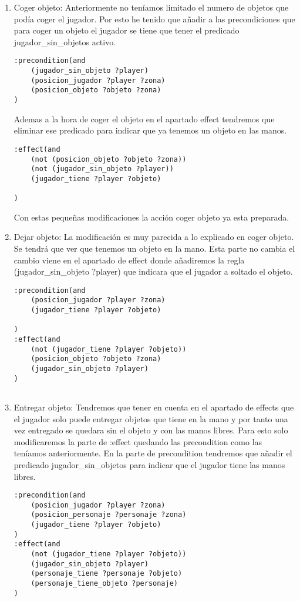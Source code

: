 \documentclass[]{article}
\begin{document}
\begin{enumerate}
	\item{Coger objeto:} Anteriormente no teníamos limitado el numero de objetos que podía coger el jugador. Por esto he tenido que añadir a las precondiciones que para coger un objeto el jugador se tiene que tener el predicado jugador\_sin\_objetos activo. 
	
	\begin{lstlisting}
:precondition(and			
	(jugador_sin_objeto ?player)
	(posicion_jugador ?player ?zona)
	(posicion_objeto ?objeto ?zona)
)
	\end{lstlisting}
	
	Ademas a la hora de coger el objeto en el apartado effect tendremos que eliminar ese predicado para indicar que ya tenemos un objeto en las manos.
	
	\begin{lstlisting}
:effect(and 
	(not (posicion_objeto ?objeto ?zona))
	(not (jugador_sin_objeto ?player))
	(jugador_tiene ?player ?objeto)
	
)
	\end{lstlisting}
	Con estas pequeñas modificaciones la acción coger objeto ya esta preparada.
	
	\item{Dejar objeto:} La modificación es muy parecida a lo explicado en coger objeto. Se tendrá que ver que tenemos un objeto en la mano. Esta parte no cambia el cambio viene en el apartado de effect donde añadiremos la regla (jugador\_sin\_objeto ?player) que indicara que el jugador a soltado el objeto.
	
	
	
	\begin{lstlisting}
:precondition(and
	(posicion_jugador ?player ?zona)
	(jugador_tiene ?player ?objeto)
	
)
:effect(and 
	(not (jugador_tiene ?player ?objeto))
	(posicion_objeto ?objeto ?zona)
	(jugador_sin_objeto ?player)
)
	

	\end{lstlisting}
\item{Entregar objeto:} Tendremos que tener en cuenta en el apartado de effects que el jugador solo puede entregar objetos que tiene en la mano y por tanto una vez entregado se quedara sin el objeto y con las manos libres. Para esto solo modificaremos la parte de :effect quedando las precondition como las teníamos anteriormente. En la parte de precondition tendremos que añadir el predicado jugador\_sin\_objetos para indicar que el jugador tiene las manos libres.


	\begin{lstlisting}
:precondition(and
	(posicion_jugador ?player ?zona)
	(posicion_personaje ?personaje ?zona)
	(jugador_tiene ?player ?objeto)
)
:effect(and 
	(not (jugador_tiene ?player ?objeto))
	(jugador_sin_objeto ?player)
	(personaje_tiene ?personaje ?objeto)
	(personaje_tiene_objeto ?personaje)
)
	\end{lstlisting}
	
\end{enumerate}	
\end{document}
